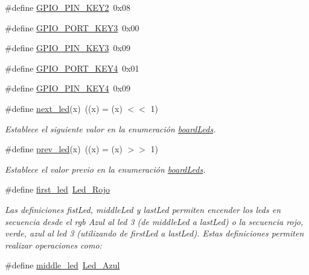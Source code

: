 \begin{DoxyCompactItemize}
\#define \hyperlink{group__hardware_ga6fe528c749e6e3df18c66c78841fd2ae}{G\+P\+I\+O\+\_\+\+P\+I\+N\+\_\+\+K\+E\+Y2}~0x08
\item 
\#define \hyperlink{group__hardware_ga6e75308c8b20c3236d0449a07bb052f7}{G\+P\+I\+O\+\_\+\+P\+O\+R\+T\+\_\+\+K\+E\+Y3}~0x00
\item 
\#define \hyperlink{group__hardware_ga6058161cd4273d1df2af95589e043055}{G\+P\+I\+O\+\_\+\+P\+I\+N\+\_\+\+K\+E\+Y3}~0x09
\item 
\#define \hyperlink{group__hardware_ga6d16f3a208324c46c462f92ad249d199}{G\+P\+I\+O\+\_\+\+P\+O\+R\+T\+\_\+\+K\+E\+Y4}~0x01
\item 
\#define \hyperlink{group__hardware_gabeaec154a7007cd91de9a8c775f4242f}{G\+P\+I\+O\+\_\+\+P\+I\+N\+\_\+\+K\+E\+Y4}~0x09
\item 
\#define \hyperlink{group__hardware_ga8dec203447e10cef9a4a1013f7c4cdd4}{next\+\_\+led}(x)~((x) = (x) $<$$<$ 1)
\begin{DoxyCompactList}\small\item\em Establece el siguiente valor en la enumeración \hyperlink{group__hardware_ga2a000bf02da2abba53355f3fcfdb2d0b}{board\+Leds}. \end{DoxyCompactList}\item 
\#define \hyperlink{group__hardware_ga6cc9878768b184e23371bbeb95360713}{prev\+\_\+led}(x)~((x) = (x) $>$$>$ 1)
\begin{DoxyCompactList}\small\item\em Establece el valor previo en la enumeración \hyperlink{group__hardware_ga2a000bf02da2abba53355f3fcfdb2d0b}{board\+Leds}. \end{DoxyCompactList}\item 
\#define \hyperlink{group__hardware_ga43a19ad1766c3719e591430d601496f7}{first\+\_\+led}~\hyperlink{group__hardware_gga84e58e8cc8e3fe349be97bcd3221c360a5662baf6795c7030ea75e47a0019a61d}{Led\+\_\+\+Rojo}
\begin{DoxyCompactList}\small\item\em Las definiciones fist\+Led, middle\+Led y last\+Led permiten encender los leds en secuencia desde el rgb Azul al led 3 (de middle\+Led a last\+Led) o la secuencia rojo, verde, azul al led 3 (utilizando de first\+Led a last\+Led). Estas definiciones permiten realizar operaciones como\+: \end{DoxyCompactList}\item 
\#define \hyperlink{group__hardware_gacbd2343998132167826e577781d85bbd}{middle\+\_\+led}~\hyperlink{group__hardware_gga84e58e8cc8e3fe349be97bcd3221c360a90357fded550cd38cda43991725234cb}{Led\+\_\+\+Azul}

\end{DoxyCompactItemize}

